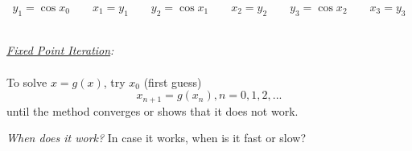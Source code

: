 \documentclass[a4paper,12pt]{report}
\begin{document}
\begin{center}
	$$ y_1 = \cos x_0 \qquad x_1 = y_1 \qquad y_2 = \cos x_1 \qquad x_2 = y_2 \qquad y_3 = \cos x_2 \qquad x_3 = y_3 $$\\
	\bigskip
\fbox
{
	\parbox{0.6\textwidth}
	{
		\noindent \textit{\underline{Fixed Point Iteration}:}\\
		\vspace{-3mm}
		\\
			To solve $x = g(x)$, try $x_0$ (first guess)
			$$x_{n+1} = g(x_n), n = 0, 1, 2, ...$$
			until the method converges or shows that it does not work.
	}
}

\end{center}
	\noindent \textit{When does it work?} In case it works, when is it fast or slow?
	
\begin{multicols}{2}



\end{multicols}
	
\end{document}
